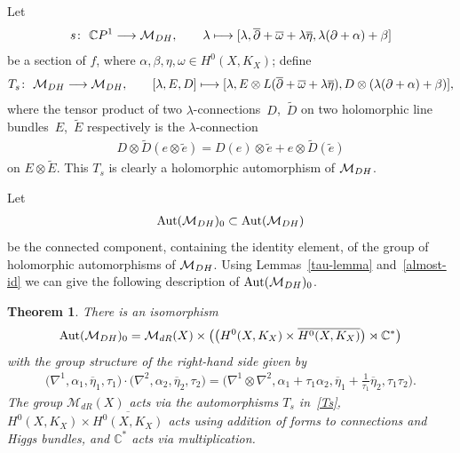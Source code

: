 \documentclass[11pt]{article}
\numberwithin{equation}{section}
\newtheorem{Theorem}{Theorem}[section]
\begin{document}
Let \begin{gather*}s \colon \ {\mathbb C}P^1 \longrightarrow {\mathcal M}_{\rm DH} ,\qquad
\lambda \longmapsto [\lambda, \overline{\partial} +\overline{\omega}+ \lambda\overline{\eta}, \lambda(\partial+\alpha)+\beta]
\end{gather*}
be a section of $f$, where $\alpha, \beta, \eta, \omega \in H^0(X, K_X)$; def\/ine
\begin{gather}\label{Ts}
T_s \colon \ {\mathcal M}_{\rm DH} \longrightarrow {\mathcal M}_{\rm DH} ,\qquad [\lambda, E, D] \longmapsto [\lambda, E\otimes
L(\overline{\partial}+\overline{\omega}+\lambda\overline{\eta}), D\otimes(\lambda(\partial+\alpha)+\beta)] ,
\end{gather}
where the tensor product of two $\lambda$-connections~$D$,~$\widetilde{D}$ on two holomorphic line bundles~$E$,~$\widetilde E$ respectively is the
$\lambda$-connection
\begin{gather*}D\otimes\widetilde{D}(e\otimes\widetilde{e}) = D(e)\otimes \widetilde{e}+e\otimes \widetilde{D}(\widetilde {e})\end{gather*}
on $E\otimes\widetilde{E}$. This $T_s$ is clearly a holomorphic automorphism of ${\mathcal M}_{\rm DH}$.

Let
\begin{gather*}
\operatorname{Aut}({\mathcal M}_{\rm DH})_0 \subset \operatorname{Aut}({\mathcal M}_{\rm DH})
\end{gather*}
be the connected component, containing the identity element, of the group of holomorphic automorphisms of ${\mathcal M}_{\rm DH}$. Using Lemmas~\ref{tau-lemma} and~\ref{almost-id} we can give the following description of $\operatorname{Aut}({\mathcal M}_{\rm DH})_0$.

\begin{Theorem}\label{thmDHa}
There is an isomorphism
\begin{gather*}\operatorname{Aut}({\mathcal M}_{\rm DH})_0 =
\mathcal M_{dR}(X)\times \big(\big(H^0(X, K_X)\times\overline{H^0(X, K_X)}\big)\rtimes {\mathbb C}^*\big)\end{gather*}
with the group structure of the right-hand side given by
\begin{gather}\label{gs37}
\big(\nabla^1, \alpha_1, \overline{\eta}_1, \tau_1\big)\cdot \big(\nabla^2, \alpha_2,\overline{\eta}_2, \tau_2\big) = \big(\nabla^1\otimes\nabla^2, \alpha_1+\tau_1\alpha_2, \overline{\eta}_1+\tfrac{1}{\tau_1}\overline{\eta}_2, \tau_1\tau_2\big) .
\end{gather}
The group $\mathcal M_{dR}(X)$ acts via the automorphisms $T_s$ in~\eqref{Ts}, $H^0(X, K_X)\times\overline{H^0(X, K_X)}$ acts using addition of forms to connections and Higgs bundles, and ${\mathbb C}^*$ acts via multiplication.
\end{Theorem}
\end{document}
